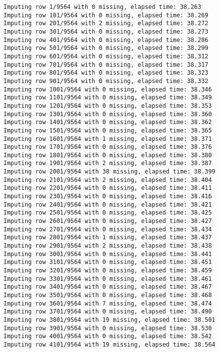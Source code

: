 \documentclass[11pt]{article}
\begin{document}
    \begin{Verbatim}[commandchars=\\\{\}]
Imputing row 1/9564 with 0 missing, elapsed time: 38.263
Imputing row 101/9564 with 0 missing, elapsed time: 38.269
Imputing row 201/9564 with 2 missing, elapsed time: 38.272
Imputing row 301/9564 with 0 missing, elapsed time: 38.273
Imputing row 401/9564 with 0 missing, elapsed time: 38.286
Imputing row 501/9564 with 0 missing, elapsed time: 38.299
Imputing row 601/9564 with 0 missing, elapsed time: 38.312
Imputing row 701/9564 with 0 missing, elapsed time: 38.317
Imputing row 801/9564 with 0 missing, elapsed time: 38.323
Imputing row 901/9564 with 0 missing, elapsed time: 38.332
Imputing row 1001/9564 with 0 missing, elapsed time: 38.346
Imputing row 1101/9564 with 0 missing, elapsed time: 38.349
Imputing row 1201/9564 with 0 missing, elapsed time: 38.353
Imputing row 1301/9564 with 0 missing, elapsed time: 38.360
Imputing row 1401/9564 with 0 missing, elapsed time: 38.362
Imputing row 1501/9564 with 0 missing, elapsed time: 38.365
Imputing row 1601/9564 with 1 missing, elapsed time: 38.371
Imputing row 1701/9564 with 0 missing, elapsed time: 38.376
Imputing row 1801/9564 with 0 missing, elapsed time: 38.380
Imputing row 1901/9564 with 2 missing, elapsed time: 38.387
Imputing row 2001/9564 with 38 missing, elapsed time: 38.399
Imputing row 2101/9564 with 2 missing, elapsed time: 38.404
Imputing row 2201/9564 with 0 missing, elapsed time: 38.411
Imputing row 2301/9564 with 0 missing, elapsed time: 38.416
Imputing row 2401/9564 with 0 missing, elapsed time: 38.421
Imputing row 2501/9564 with 0 missing, elapsed time: 38.425
Imputing row 2601/9564 with 0 missing, elapsed time: 38.427
Imputing row 2701/9564 with 0 missing, elapsed time: 38.434
Imputing row 2801/9564 with 1 missing, elapsed time: 38.437
Imputing row 2901/9564 with 2 missing, elapsed time: 38.438
Imputing row 3001/9564 with 0 missing, elapsed time: 38.441
Imputing row 3101/9564 with 0 missing, elapsed time: 38.451
Imputing row 3201/9564 with 0 missing, elapsed time: 38.459
Imputing row 3301/9564 with 0 missing, elapsed time: 38.461
Imputing row 3401/9564 with 0 missing, elapsed time: 38.467
Imputing row 3501/9564 with 0 missing, elapsed time: 38.468
Imputing row 3601/9564 with 7 missing, elapsed time: 38.474
Imputing row 3701/9564 with 0 missing, elapsed time: 38.490
Imputing row 3801/9564 with 19 missing, elapsed time: 38.501
Imputing row 3901/9564 with 0 missing, elapsed time: 38.530
Imputing row 4001/9564 with 0 missing, elapsed time: 38.542
Imputing row 4101/9564 with 19 missing, elapsed time: 38.564

\end{Verbatim}
\end{document}
